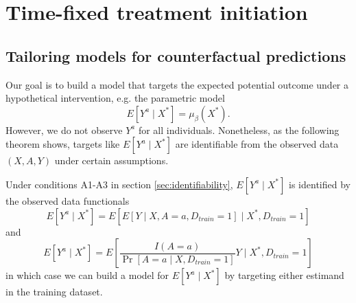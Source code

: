 
\section{Time-fixed treatment initiation} \label{sec:appendixa}

    \subsection{Tailoring models for counterfactual predictions}\label{sec:model_proof}
    Our goal is to build a model that targets the expected potential outcome under a hypothetical intervention, e.g. the parametric model 
    $$E[Y^a \mid X^*] = \mu_{\beta}(X^*).$$
    However, we do not observe $Y^a$ for all individuals. Nonetheless, as the following theorem shows, targets like $E[Y^a \mid X^*]$ are identifiable from the observed data $(X, A, Y)$ under certain assumptions. 
    
    \begin{theorem}
     Under conditions A1-A3 in section \ref{sec:identifiability}, $E[Y^a \mid X^*]$ is identified by the observed data functionals
    \begin{equation}
        E[Y^a \mid X^*] = E[E[Y \mid X, A = a, D_{train} = 1] \mid X^*, D_{train} = 1]
    \end{equation}
    and
    \begin{equation}
        E[Y^a \mid X^*] = E\left[\frac{I(A = a)}{\Pr[A = a \mid X, D_{train} = 1]} Y \mid X^*, D_{train} = 1\right]
    \end{equation}
    in which case we can build a model for $E[Y^a \mid X^*]$ by targeting either estimand in the training dataset.
    \end{theorem}
    
